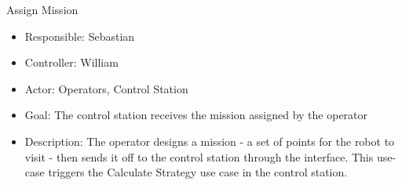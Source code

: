 Assign Mission
\begin{itemize}
    \item Responsible: Sebastian
    \item Controller: William
    \item Actor: Operators, Control Station
    \item Goal: The control station receives the mission assigned by the operator
    \item Description: The operator designs a mission - a set of points for the robot to visit - then sends it off to the control station through the interface. This use-case triggers the Calculate Strategy use case in the control station.
\end{itemize}
